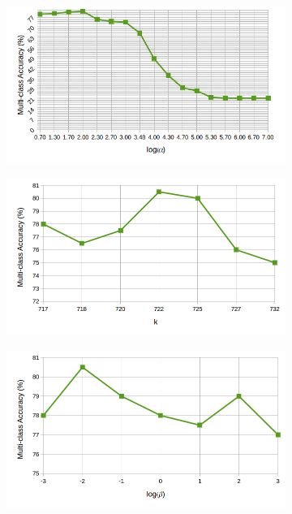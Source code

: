 \begin{figure}[!h]
\begin{subfigure}[b]{0.3\linewidth}
    \caption{}
  \end{subfigure}
    \begin{subfigure}[b]{0.3\linewidth}
    \includegraphics[width=\linewidth]{images/simple_gamma_sun}
    \caption{}
  \end{subfigure}
  \begin{subfigure}[b]{0.3\linewidth}
    \includegraphics[width=\linewidth]{images/simple_k_sun}
    \caption{}
  \end{subfigure}
    \begin{subfigure}[b]{0.3\linewidth}
    \includegraphics[width=\linewidth]{images/simple_beta_sun}

\end{subfigure}
\end{figure}
